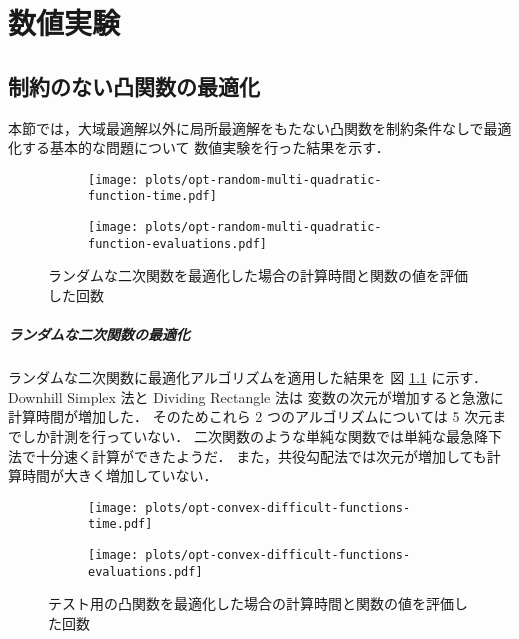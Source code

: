 %

\chapter{数値実験}

\section{制約のない凸関数の最適化}

本節では，大域最適解以外に局所最適解をもたない凸関数を制約条件なしで最適化する基本的な問題について
数値実験を行った結果を示す．

\begin{figure}[tp]
    \centering
    \begin{subfigure}{0.85\linewidth}
        \centering
        \texttt{[image: plots/opt-random-multi-quadratic-function-time.pdf]}
    \end{subfigure}
    \begin{subfigure}{0.85\linewidth}
        \centering
        \texttt{[image: plots/opt-random-multi-quadratic-function-evaluations.pdf]}
    \end{subfigure}
    \caption{ランダムな二次関数を最適化した場合の計算時間と関数の値を評価した回数}
    \label{fig:optimization_unconstrained-convex-optimization_random-multi-quadratic-function}
\end{figure}

\paragraph{ランダムな二次関数の最適化}
ランダムな二次関数に最適化アルゴリズムを適用した結果を
図 \ref{fig:optimization_unconstrained-convex-optimization_random-multi-quadratic-function} に示す．
Downhill Simplex 法と Dividing Rectangle 法は
変数の次元が増加すると急激に計算時間が増加した．
そのためこれら 2 つのアルゴリズムについては 5 次元までしか計測を行っていない．
二次関数のような単純な関数では単純な最急降下法で十分速く計算ができたようだ．
また，共役勾配法では次元が増加しても計算時間が大きく増加していない．

\begin{figure}[tp]
    \centering
    \begin{subfigure}{0.85\linewidth}
        \centering
        \texttt{[image: plots/opt-convex-difficult-functions-time.pdf]}
    \end{subfigure}
    \begin{subfigure}{0.85\linewidth}
        \centering
        \texttt{[image: plots/opt-convex-difficult-functions-evaluations.pdf]}
    \end{subfigure}
    \caption{テスト用の凸関数を最適化した場合の計算時間と関数の値を評価した回数}
    \label{fig:optimization_unconstrained-convex-optimization_convex-difficult-function}
\end{figure}

